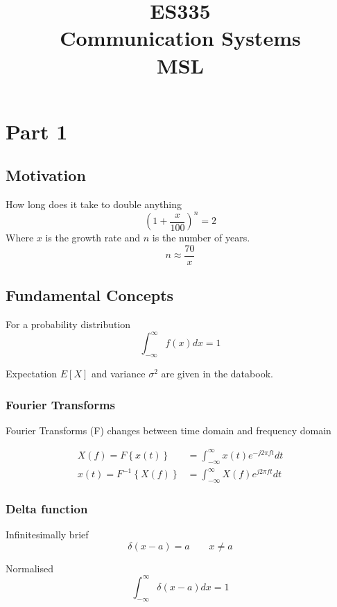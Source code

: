 \documentclass[a4paper]{article}
\title{ES335 \\ Communication Systems \\ MSL}
\newcommand{\infint}{ \int_{-\infty}^{\infty}}
\begin{document}
	\section{Part 1}
		\subsection{Motivation}
			How long does it take to double anything
			\begin{equation}
				\left( 1+\frac{x}{100}\right)^n = 2
			\end{equation}
			Where $x$ is the growth rate and $n$ is the number of years.
			\begin{equation}
				n \approx \frac{70}{x}
			\end{equation}

		\subsection{Fundamental Concepts}
			For a probability distribution
			\begin{equation}
				\infint f(x) dx =1
			\end{equation}

			Expectation $E[X]$ and variance $\sigma^2$ are given in the databook.

			\subsubsection{Fourier Transforms}
				Fourier Transforms (F) changes between time domain and frequency domain

				\begin{align}
					X(f)= F \left\{ x(t) \right\} & = \infint x(t)e^{-j 2 \pi f t} dt\\
					x(t) = F ^{-1}\left\{ X(f) \right\} & = \infint X(f)e^{j 2 \pi f t} dt
				\end{align}

			\subsubsection{Delta function}
				Infinitesimally brief
				\begin{equation}
					\delta (x-a)=a \qquad x\ne a
				\end{equation}

				Normalised
				\begin{equation}
					\infint 	\delta (x-a) dx = 1
				\end{equation}
\end{document}
